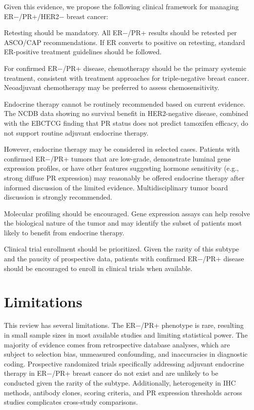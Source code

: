 \documentclass{article}
\begin{document}
Given this evidence, we propose the following clinical framework for managing ER−/PR+/HER2− breast cancer:

Retesting should be mandatory. All ER−/PR+ results should be retested per ASCO/CAP recommendations. If ER converts to positive on retesting, standard ER-positive treatment guidelines should be followed.

For confirmed ER−/PR+ disease, chemotherapy should be the primary systemic treatment, consistent with treatment approaches for triple-negative breast cancer. Neoadjuvant chemotherapy may be preferred to assess chemosensitivity.

Endocrine therapy cannot be routinely recommended based on current evidence. The NCDB data showing no survival benefit in HER2-negative disease, combined with the EBCTCG finding that PR status does not predict tamoxifen efficacy, do not support routine adjuvant endocrine therapy.

However, endocrine therapy may be considered in selected cases. Patients with confirmed ER−/PR+ tumors that are low-grade, demonstrate luminal gene expression profiles, or have other features suggesting hormone sensitivity (e.g., strong diffuse PR expression) may reasonably be offered endocrine therapy after informed discussion of the limited evidence. Multidisciplinary tumor board discussion is strongly recommended.

Molecular profiling should be encouraged. Gene expression assays can help resolve the biological nature of the tumor and may identify the subset of patients most likely to benefit from endocrine therapy.

Clinical trial enrollment should be prioritized. Given the rarity of this subtype and the paucity of prospective data, patients with confirmed ER−/PR+ disease should be encouraged to enroll in clinical trials when available.

\section{Limitations}

This review has several limitations. The ER−/PR+ phenotype is rare, resulting in small sample sizes in most available studies and limiting statistical power. The majority of evidence comes from retrospective database analyses, which are subject to selection bias, unmeasured confounding, and inaccuracies in diagnostic coding. Prospective randomized trials specifically addressing adjuvant endocrine therapy in ER−/PR+ breast cancer do not exist and are unlikely to be conducted given the rarity of the subtype. Additionally, heterogeneity in IHC methods, antibody clones, scoring criteria, and PR expression thresholds across studies complicates cross-study comparisons.
\end{document}
